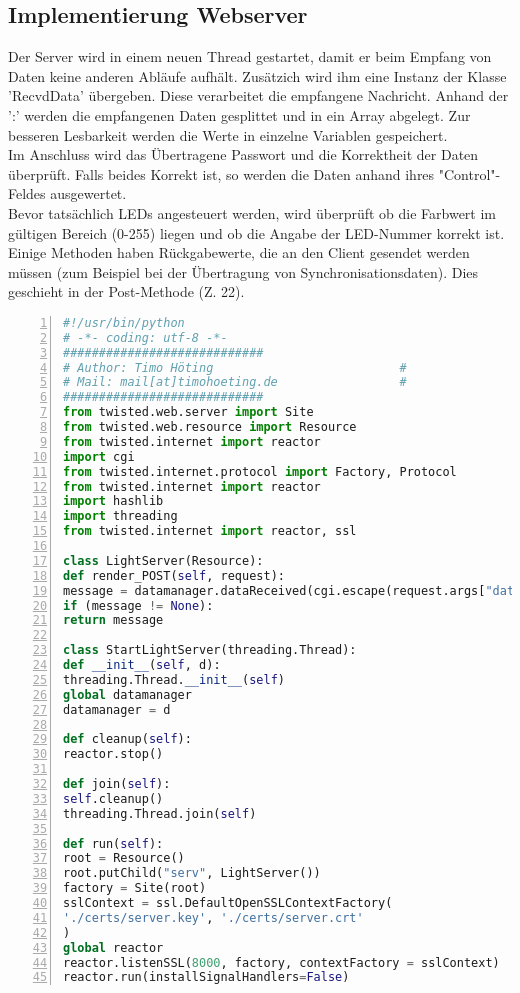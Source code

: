 \subsection{Implementierung Webserver}
Der Server wird in einem neuen Thread gestartet, damit er beim Empfang von Daten keine anderen Abläufe aufhält. Zusätzich wird ihm eine Instanz der Klasse 'RecvdData' übergeben. Diese verarbeitet die empfangene Nachricht. 
Anhand der ':' werden die empfangenen Daten gesplittet und in ein Array abgelegt. Zur besseren Lesbarkeit werden die Werte in einzelne Variablen gespeichert. \\
Im Anschluss wird das Übertragene Passwort und die Korrektheit der Daten überprüft. Falls beides Korrekt ist, so werden die Daten anhand ihres "Control"-Feldes ausgewertet. \\
Bevor tatsächlich LEDs angesteuert werden, wird überprüft ob die Farbwert im gültigen Bereich (0-255) liegen und ob die Angabe der LED-Nummer korrekt ist.\\
Einige Methoden haben Rückgabewerte, die an den Client gesendet werden müssen (zum Beispiel bei der Übertragung von Synchronisationsdaten). Dies geschieht in der Post-Methode (Z. 22).
\begin{lstlisting}[caption =Implementierung des Webservers in Python, language=python, frame=single, breaklines=true,columns=fullflexible, commentstyle=\color{gray}\upshape, captionpos=b, numbers = left]
#!/usr/bin/python
# -*- coding: utf-8 -*-
############################
# Author: Timo Höting                          #
# Mail: mail[at]timohoeting.de                 #
############################
from twisted.web.server import Site
from twisted.web.resource import Resource
from twisted.internet import reactor
import cgi
from twisted.internet.protocol import Factory, Protocol
from twisted.internet import reactor
import hashlib
import threading
from twisted.internet import reactor, ssl

class LightServer(Resource):
def render_POST(self, request):
message = datamanager.dataReceived(cgi.escape(request.args["data"][0]))
if (message != None):
return message

class StartLightServer(threading.Thread):
def __init__(self, d):
threading.Thread.__init__(self)
global datamanager
datamanager = d

def cleanup(self):
reactor.stop()

def join(self):
self.cleanup()
threading.Thread.join(self)

def run(self):
root = Resource()
root.putChild("serv", LightServer())
factory = Site(root)
sslContext = ssl.DefaultOpenSSLContextFactory(
'./certs/server.key', './certs/server.crt'
)
global reactor
reactor.listenSSL(8000, factory, contextFactory = sslContext)
reactor.run(installSignalHandlers=False)

\end{lstlisting}

